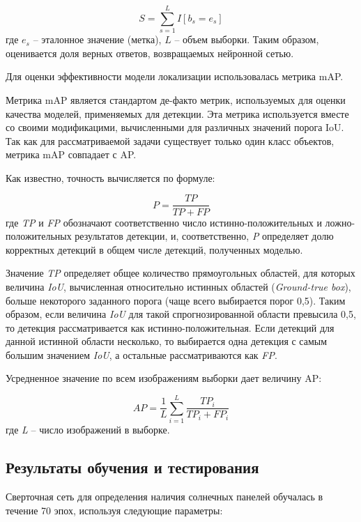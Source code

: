 \begin{equation*}
    S = \sum_{s=1}^L I[b_s = e_s]
\end{equation*}
где $e_s$ -- эталонное значение (метка), $L$ -- объем выборки. Таким образом, оценивается доля верных ответов, возвращаемых нейронной сетью.

Для оценки эффективности модели локализации использовалась метрика mAP.

Метрика mAP является стандартом де-факто метрик, используемых для оценки качества моделей, применяемых для детекции. Эта метрика используется вместе со своими модификацими, вычисленными для различных значений порога IoU. Так как для рассматриваемой задачи существует только один класс объектов, метрика mAP совпадает с AP.

Как известно, точность вычисляется по формуле:

\begin{equation*}
    P = \frac{TP}{TP + FP}
\end{equation*}
где \textit{TP} и \textit{FP} обозначают соответственно число истинно-положительных и ложно-положительных результатов детекции, и, соответственно, \textit{P} определяет долю корректных детекций в общем числе детекций, полученных моделью.

Значение \textit{TP} определяет общее количество прямоугольных областей, для которых величина \textit{IoU}, вычисленная относительно истинных областей (\textit{Ground-true box}), больше некоторого заданного порога (чаще всего выбирается порог 0,5). Таким образом, если величина \textit{IoU} для такой спрогнозированной области превысила 0,5, то детекция рассматривается как истинно-положительная. Если детекций для данной истинной области несколько, то выбирается одна детекция с самым большим значением \textit{IoU}, а остальные рассматриваются как \textit{FP}.

Усредненное значение по всем изображениям выборки дает величину AP:

\begin{equation*}
    AP = \frac{1}{L} \sum_{i=1}^L \frac{TP_i}{TP_i + FP_i}
\end{equation*}
где \textit{L} -- число изображений в выборке.

\subsection{Результаты обучения и тестирования}

Сверточная сеть для определения наличия солнечных панелей обучалась в течение 70 эпох, используя следующие параметры:

